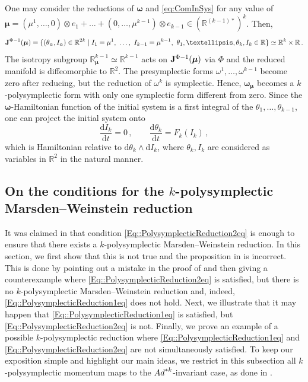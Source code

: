 \documentclass[11pt]{article}
\theoremstyle{plain}
\theoremstyle{definition}
\newcommand{\bomega}{{\boldsymbol{\omega}}}
\renewcommand{\d}{\mathrm{d}}
\def\d{\mathrm{d}}
\numberwithin{equation}{section}
\begin{document}
One may consider the reductions of $\bomega$ and \eqref{eq:ComInSys} for any value of $\bm \mu=(\mu^1,\ldots,0)\otimes e_1+\ldots+(0,\ldots,\mu^{k-1})\otimes e_{k-1}\in \left(\mathbb{R}^{(k-1)*}\right)^k$. Then,
\[
    {\bf J}^{\Phi-1}(\bm \mu) = \{(\theta_\alpha,I_\alpha)\in \mathbb{R}^{2k}\mid I_1=\mu^1,\ \dotsc,\ I_{k-1}=\mu^{k-1},\ \theta_1,\ldots, \theta_k,I_k\in \mathbb{R}\}\simeq \mathbb{R}^{k}\times \mathbb{R}\,.
\]
The isotropy subgroup $\mathbb{R}^{k-1}_{\bm\mu}\simeq \mathbb{R}^{k-1}$ acts on ${\bf J}^{\Phi-1}(\bm\mu)$ via $\Phi$ and the reduced manifold is diffeomorphic to  $\mathbb{R}^2$. The presymplectic forms $\omega^1,\ldots,\omega^{k-1}$ become zero after reducing, but  the reduction of $\omega^k$ is symplectic. Hence, $\bomega_{\bm\mu}$ becomes a $k$-polysymplectic form with only one symplectic form different from zero. Since the $\bomega$-Hamiltonian function of the initial system is a first integral of the $\theta_1,\ldots,\theta_{k-1}$, one can project the initial system onto 
\[
\frac{\d I_k}{\d t}=0\,,\qquad \frac{\d\theta_k}{\d t} = F_k(I_k)\,,
\]
which is Hamiltonian relative to $\d\theta_k\wedge \d I_k$, where $\theta_k, I_k$ are considered as variables in $\mathbb{R}^2$ in the natural manner.




\subsection{On the conditions for the \texorpdfstring{$k$}--polysymplectic Marsden--Weinstein reduction}
\label{Subsec::Conditions}

It was claimed in \cite[Proposition 1]{GM_23}  that condition \eqref{Eq::PolysymplecticReduction2eq} is enough to ensure that there exists a $k$-polysymplectic Marsden--Weinstein reduction. In this section, we first show that this is not true and the proposition in \cite[Proposition 1]{GM_23} is incorrect. This is done by pointing out a mistake in the proof of \cite[Proposition 1]{GM_23} and then giving a counterexample where \eqref{Eq::PolysymplecticReduction2eq} is satisfied, but there is no $k$-polysymplectic Marsden--Weinstein reduction and, indeed, \eqref{Eq::PolysymplecticReduction1eq} does not hold. Next, we illustrate that it may happen that \eqref{Eq::PolysymplecticReduction1eq} is satisfied, but \eqref{Eq::PolysymplecticReduction2eq} is not. Finally, we prove an example of a possible $k$-polysymplectic reduction where \eqref{Eq::PolysymplecticReduction1eq} and \eqref{Eq::PolysymplecticReduction2eq} are not simultaneously satisfied. To keep our exposition simple and highlight our main ideas, we restrict in this subsection all $k$-polysymplectic momentum maps to the ${\rm Ad}^{*k}$-invariant case, as done in \cite{GM_23,MRSV_15}.
\end{document}

